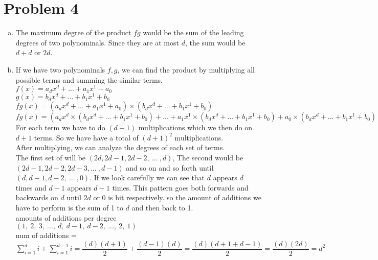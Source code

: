\documentclass[11pt,letterpaper]{article}
\begin{document}
\section*{Problem 4}
\begin{enumerate}[(a)]
\item
The maximum degree of the product $fg$ would be the sum of the leading degrees of two polynominals. Since they are at most $d$, the sum would be $d+d$ or $2d$.\\
\item
If we have two polynominals $f,g$, we can find the product by multiplying all possible terms and summing the similar terms.\\
$f(x) = a_dx^d + ... + a_1x^1 + a_0$\\
$g(x) = b_dx^d + ... + b_1x^1 + b_0$\\
$fg(x) = (a_dx^d + ... + a_1x^1 + a_0)\times( b_dx^d + ... + b_1x^1 + b_0)$\\
$fg(x) = (a_dx^d\times( b_dx^d + ... + b_1x^1 + b_0) + ... + a_1x^1\times( b_dx^d + ... + b_1x^1 + b_0) + a_0\times( b_dx^d + ... + b_1x^1 + b_0))$\\
For each term we have to do $(d+1)$ multiplications which we then do on $d+1$ terms. So we have have a total of $(d+1)^2$ multiplications.\\
After multiplying, we can analyze the degrees of each set of terms.\\
The first set of will be $(2d,2d-1,2d-2,~...~,d)$, The second would be \\
$(2d-1, 2d-2, 2d-3, ...~,d-1)$ and so on and so forth until $(d,d-1,d-2,~...~,0)$. If we look carefully we can see that $d$ appears $d$ times and $d-1$ appears $d-1$ times. This pattern goes both forwards and backwards on $d$ until $2d$ or 0 is hit respectively. so the amount of additions we have to perform is the  sum of 1 to $d$ and then back to 1.\\
amounts of additions per degree \\
$(1,~2,~3,~ ...,~ d, ~d-1,~d-2,~ ...,~ 2,~1)$
\\
num of additions = $\sum\limits_{i=1}^{d}i + \sum\limits_{i=1}^{d-1}i = \dfrac{(d)(d+1)}{2} + \dfrac{(d-1)(d)}{2} = \dfrac{(d)(d+1+d-1)}{2} = \dfrac{(d)(2d)}{2} = d^2$\\


\end{enumerate}
\end{document}
